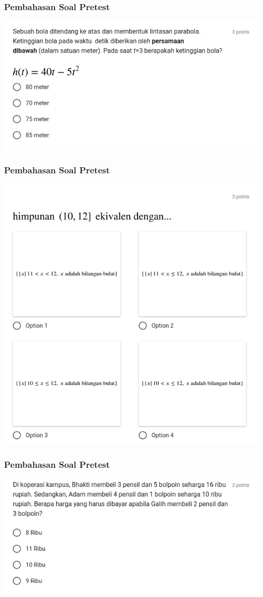 \documentclass[pdflatex,compress,mathserif]{beamer}
\begin{document}
	\begin{frame}
		\frametitle{Pembahasan Soal Pretest}
		\begin{center}
			\includegraphics[width=\linewidth]{img/img16}
		\end{center}
	\end{frame}
	
	\begin{frame}
		\frametitle{Pembahasan Soal Pretest}
		\begin{center}
			\includegraphics[width=0.6\linewidth]{img/img17}
		\end{center}
	\end{frame}
	
	\begin{frame}
		\frametitle{Pembahasan Soal Pretest}
		\begin{center}
			\includegraphics[width=\linewidth]{img/img18}
		\end{center}
	\end{frame}
	
\end{document}
